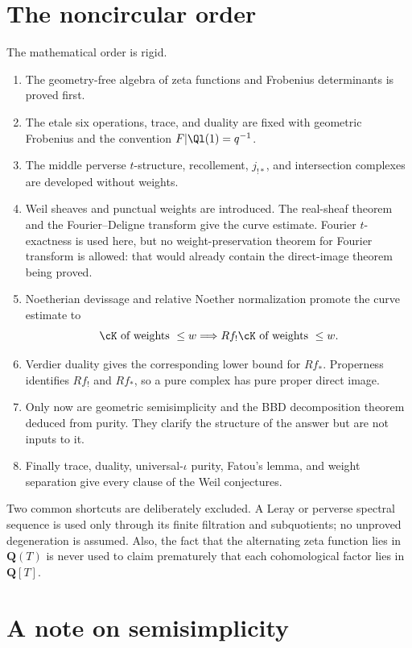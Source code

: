 \section*{The noncircular order}

The mathematical order is rigid.

\begin{enumerate}
\item The geometry-free algebra of zeta functions and Frobenius determinants
      is proved first.
\item The etale six operations, trace, and duality are fixed with geometric
      Frobenius and the convention \(F|\Ql(1)=q^{-1}\).
\item The middle perverse \(t\)-structure, recollement, \(j_{!*}\), and
      intersection complexes are developed without weights.
\item Weil sheaves and punctual weights are introduced.  The real-sheaf
      theorem and the Fourier--Deligne transform give the curve estimate.
      Fourier \(t\)-exactness is used here, but no weight-preservation theorem
      for Fourier transform is allowed: that would already contain the
      direct-image theorem being proved.
\item Noetherian devissage and relative Noether normalization promote the
      curve estimate to
      \[
        \cK\text{ of weights }\leq w
        \Longrightarrow Rf_!\cK\text{ of weights }\leq w.
      \]
\item Verdier duality gives the corresponding lower bound for \(Rf_*\).
      Properness identifies \(Rf_!\) and \(Rf_*\), so a pure complex has pure
      proper direct image.
\item Only now are geometric semisimplicity and the BBD decomposition theorem
      deduced from purity.  They clarify the structure of the answer but are
      not inputs to it.
\item Finally trace, duality, universal-\(\iota\) purity, Fatou's lemma, and
      weight separation give every clause of the Weil conjectures.
\end{enumerate}

Two common shortcuts are deliberately excluded.  A Leray or perverse spectral
sequence is used only through its finite filtration and subquotients; no
unproved degeneration is assumed.  Also, the fact that the alternating zeta
function lies in \(\mathbf Q(T)\) is never used to claim prematurely that each
cohomological factor lies in \(\mathbf Q[T]\).

\section*{A note on semisimplicity}

